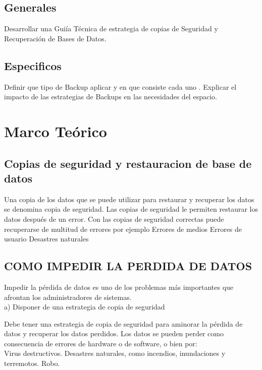 \documentclass[a4paper,twocolumn,10pt]{article}
\begin{document}
    \subsection{Generales}
       \normalsize Desarrollar una Gui\'ia T\'ecnica de estrategia de copias de Seguridad y Recuperaci\'on de Bases de Datos.
    \subsection{Especificos}
       \normalsize Definir que tipo de Backup aplicar y en que consiste cada uno . Explicar el impacto de las estrategias de Backups en las necesidades del espacio.

\section{Marco Te\'orico}
	 \subsection{Copias de seguridad y restauracion de base de datos}
Una copia de los datos que se puede utilizar para restaurar y recuperar los datos se denomina copia de seguridad. Las copias de seguridad le permiten restaurar los datos después de un error. Con las copias de seguridad correctas puede recuperarse de multitud de errores por ejemplo
		\normalsize Errores de medios
		\normalsize Errores de usuario
		\normalsize Desastres naturales

	 \subsection{COMO IMPEDIR LA PERDIDA DE DATOS}
Impedir la pérdida de datos es uno de los problemas más importantes que afrontan los administradores de sistemas.\\
a) Disponer de una estrategia de copia de seguridad

Debe tener una estrategia de copia de seguridad para aminorar la pérdida de datos y recuperar los datos perdidos. Los datos se pueden perder como consecuencia de errores de hardware o de software, o bien por:\\

\normalsize Virus destructivos.
\normalsize Desastres naturales, como incendios, inundaciones y terremotos.
\normalsize Robo.
\end{document}
